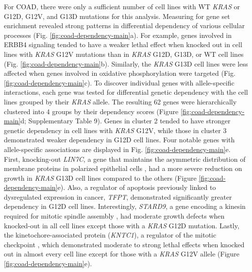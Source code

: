 \documentclass[english, 10pt, letterpaper]{article}
\newcommand{\KRAS}{\emph{KRAS}}
\begin{document}
For COAD, there were only a sufficient number of cell lines with WT \KRAS{} or G12D, G12V, and G13D mutations for this analysis.
Measuring for gene set enrichment revealed strong patterns in differential dependency of various cellular processes (Fig. \ref{fig:coad-dependency-main}a).
For example, genes involved in ERBB4 signaling tended to have a weaker lethal effect when knocked out in cell lines with \KRAS{} G12V mutations than in \KRAS{} G12D, G13D, or WT cell lines (Fig. \ref{fig:coad-dependency-main}b).
Similarly, the \KRAS{} G13D cell lines were less affected when genes involved in oxidative phosphorylation were targeted (Fig. \ref{fig:coad-dependency-main}c).
To discover individual genes with allele-specific interactions, each gene was tested for differential genetic dependency with the cell lines grouped by their \KRAS{} allele.
The resulting 62 genes were hierarchically clustered into 4 groups by their dependency scores (Figure \ref{fig:coad-dependency-main}d; Supplementary Table 9).
Genes in cluster 2 tended to have stronger genetic dependency in cell lines with \KRAS{} G12V, while those in cluster 3 demonstrated weaker dependency in G12D cell lines.
Four notable genes with allele-specific associations are displayed in Fig. \ref{fig:coad-dependency-main}e.
First, knocking-out \emph{LIN7C}, a gene that maintains the asymmetric distribution of membrane proteins in polarized epithelial cells \cite{Monastyrskaya2013MiR-199a-5pSyndrome}, had a more severe reduction on growth in \KRAS{} G13D cell lines compared to the others (Figure \ref{fig:coad-dependency-main}e).
Also, a regulator of apoptosis previously linked to dysregulated expression in cancer, \emph{TFPT}, demonstrated significantly greater dependency in G12D cell lines.
Interestingly, \emph{STARD9}, a gene encoding a kinesin required for mitotic spindle assembly \cite{Torres2011TheAssembly}, had moderate growth defects when knocked-out in all cell lines except those with a \KRAS{} G12D mutation.
Lastly, the kinetochore-associated protein (\emph{KNTC1}), a regulator of the mitotic checkpoint \cite{Chan2000HumanKinetochores., Scaerou2001TheKinetochore., Kops2005ZW10Kinetochore.}, which demonstrated moderate to strong lethal effects when knocked out in almost every cell line except for those with a \KRAS{} G12V allele (Figure \ref{fig:coad-dependency-main}e).
\end{document}
